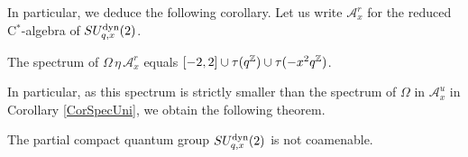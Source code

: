 In particular, we deduce the following corollary. Let us write $\mathcal{A}_x^r$ for the reduced C$^*$-algebra of $SU_{q,x}^{\operatorname{\mathrm{dyn}}}(2)$.

\begin{Cor} The spectrum of $\Omega \,\eta\, \mathcal{A}_x^r$ equals $\lbrack -2,2\rbrack \cup \tau(q^{\mathbb{Z}}) \cup \tau(-x^2q^{\mathbb{Z}})$.
\end{Cor} 

In particular, as this spectrum is strictly smaller than the spectrum of $\Omega$ in $\mathcal{A}_x^u$ in Corollary \ref{CorSpecUni}, we obtain the following theorem.

\begin{Theorem} The partial compact quantum group $SU_{q,x}^{\operatorname{\mathrm{dyn}}}(2)$ is not coamenable.
\end{Theorem} 





